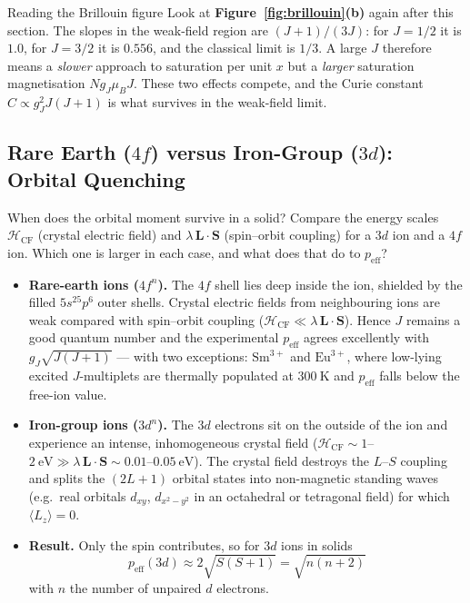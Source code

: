 \documentclass[11pt,a4paper]{article}
\newcommand{\vb}[1]{\mathbf{#1}}
\begin{document}
\begin{takeawaybox}{Reading the Brillouin figure}
Look at \textbf{Figure~\ref{fig:brillouin}(b)} again after this section. The slopes in the weak-field region are $(J+1)/(3J)$: for $J = 1/2$ it is $1.0$, for $J = 3/2$ it is $0.556$, and the classical limit is $1/3$. A large $J$ therefore means a \emph{slower} approach to saturation per unit $x$ but a \emph{larger} saturation magnetisation $Ng_J\mu_BJ$. These two effects compete, and the Curie constant $C\propto g_J^2J(J+1)$ is what survives in the weak-field limit.
\end{takeawaybox}

\subsection{Rare Earth \texorpdfstring{($4f$)}{(4f)} versus Iron-Group \texorpdfstring{($3d$)}{(3d)}: Orbital Quenching}

\begin{checkpointbox}{When does the orbital moment survive in a solid?}
Compare the energy scales $\mathcal{H}_{\mathrm{CF}}$ (crystal electric field) and $\lambda\,\vb{L}\cdot\vb{S}$ (spin--orbit coupling) for a $3d$ ion and a $4f$ ion. Which one is larger in each case, and what does that do to $p_{\mathrm{eff}}$?
\end{checkpointbox}

\begin{itemize}[leftmargin=1.6cm]
    \item \textbf{Rare-earth ions ($4f^n$).} The $4f$ shell lies deep inside the ion, shielded by the filled $5s^25p^6$ outer shells. Crystal electric fields from neighbouring ions are weak compared with spin--orbit coupling ($\mathcal{H}_{\mathrm{CF}}\ll\lambda\,\vb{L}\cdot\vb{S}$). Hence $J$ remains a good quantum number and the experimental $p_{\mathrm{eff}}$ agrees excellently with $g_J\sqrt{J(J+1)}$ --- with two exceptions: $\text{Sm}^{3+}$ and $\text{Eu}^{3+}$, where low-lying excited $J$-multiplets are thermally populated at $300\ \mathrm{K}$ and $p_{\mathrm{eff}}$ falls below the free-ion value.
    \item \textbf{Iron-group ions ($3d^n$).} The $3d$ electrons sit on the outside of the ion and experience an intense, inhomogeneous crystal field ($\mathcal{H}_{\mathrm{CF}}\sim 1$--$2\ \mathrm{eV} \gg \lambda\,\vb{L}\cdot\vb{S}\sim 0.01$--$0.05\ \mathrm{eV}$). The crystal field destroys the $L$--$S$ coupling and splits the $(2L+1)$ orbital states into non-magnetic standing waves (e.g.\ real orbitals $d_{xy}$, $d_{x^2-y^2}$ in an octahedral or tetragonal field) for which $\langle L_z\rangle = 0$.
    \item \textbf{Result.} Only the spin contributes, so for $3d$ ions in solids
    \begin{equation}
        \boxed{\;p_{\mathrm{eff}}(3d) \approx 2\sqrt{S(S+1)} = \sqrt{n(n+2)}\;}
        \label{eq:quenched}
    \end{equation}
    with $n$ the number of unpaired $d$ electrons.
\end{itemize}
\end{document}
